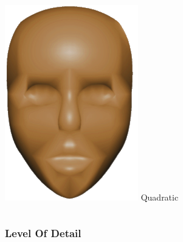 \begin{frame}
\begin{columns}
\begin{column}{0.4\textwidth}
\begin{center}
					\includegraphics[width=\textwidth]{img/1_single/quadriticallyVaryingNormals.png}
					\small{Quadratic}
				\end{center}	
			\end{column}
		\end{columns}
	\end{frame}

	\begin{frame}
		\frametitle{Level Of Detail}
	\end{frame}	

